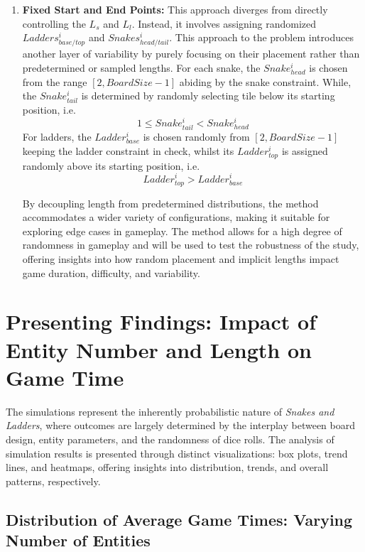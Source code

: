 \begin{enumerate}
	\item \textbf{Fixed Start and End Points:} This approach diverges from directly controlling the $L_s$ and $L_l$. Instead, it involves assigning randomized $Ladders^i_{base/top}$ and $Snakes^i_{head/tail}$. This approach to the problem introduces another layer of variability by purely focusing on their placement rather than predetermined or sampled lengths.
	For each snake, the $Snake^i_{head}$ is chosen from the range $[2, BoardSize - 1]$ abiding by the snake constraint. While, the $Snake^i_{tail}$ is determined by randomly selecting tile below its starting position, i.e. $$1\leq Snake^i_{tail} < Snake^i_{head}$$ 
	For ladders, the $Ladder^i_{base}$ is chosen randomly from $[2, BoardSize - 1]$ keeping the ladder constraint in check, whilst its $Ladder^i_{top}$ is assigned randomly above its starting position, i.e. $$Ladder^i_{top}>Ladder^i_{base}$$ 
	
	By decoupling length from predetermined distributions, the method accommodates a wider variety of configurations, making it suitable for exploring edge cases in gameplay. The method allows for a high degree of randomness in gameplay and will be used to test the robustness of the study, offering insights into how random placement and implicit lengths impact game duration, difficulty, and variability.
\end{enumerate}


\section{Presenting Findings: Impact of Entity Number and Length on Game Time}

The simulations represent the inherently probabilistic nature of \textit{Snakes and Ladders}, where outcomes are largely determined by the interplay between board design, entity parameters, and the randomness of dice rolls. The analysis of simulation results is presented through distinct visualizations: box plots, trend lines, and heatmaps, offering insights into distribution, trends, and overall patterns, respectively.

\subsection{Distribution of Average Game Times: Varying Number of Entities}

